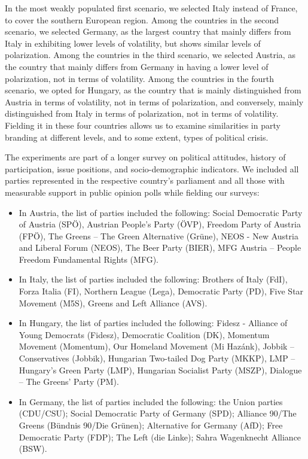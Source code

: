 \documentclass[12pt]{article}
\begin{document}
In the most weakly populated first scenario, we selected Italy instead of France, to cover the southern European region. Among the countries in the second scenario, we selected Germany, as the largest country that mainly differs from Italy in exhibiting lower levels of volatility, but shows similar levels of polarization. Among the countries in the third scenario, we selected Austria, as the country that mainly differs from Germany in having a lower level of polarization, not in terms of volatility. Among the countries in the fourth scenario, we opted for Hungary, as the country that is mainly distinguished from Austria in terms of volatility, not in terms of polarization, and conversely, mainly distinguished from Italy in terms of polarization, not in terms of volatility. Fielding it in these four countries allows us to examine similarities in party branding at different levels, and to some extent, types of political crisis.

The experiments are part of a longer survey on political attitudes, history of participation, issue positions, and socio-demographic indicators. We included all parties represented in the respective country's parliament and all those with measurable support in public opinion polls while fielding our surveys:
\begin{itemize}
\item{In Austria, the list of parties included the following: Social Democratic Party of Austria (SPÖ), Austrian People's Party (ÖVP), Freedom Party of Austria (FPÖ), The Greens – The Green Alternative (Grüne), NEOS - New Austria and Liberal Forum (NEOS), The Beer Party (BIER), MFG Austria – People Freedom Fundamental Rights (MFG).}
\item{In Italy, the list of parties included the following: Brothers of Italy (FdI), Forza Italia (FI), Northern League (Lega), Democratic Party (PD), Five Star Movement (M5S), Greens and Left Alliance (AVS).}
\item{In Hungary, the list of parties included the following: Fidesz - Alliance of Young Democrats (Fidesz), Democratic Coalition (DK), Momentum Movement (Momentum), Our Homeland Movement (Mi Hazánk), Jobbik – Conservatives (Jobbik), Hungarian Two-tailed Dog Party (MKKP), LMP – Hungary's Green Party (LMP), Hungarian Socialist Party (MSZP), Dialogue – The Greens' Party (PM).}
\item{In Germany, the list of parties included the following: the Union parties (CDU/CSU); Social Democratic Party of Germany (SPD); Alliance 90/The Greens (Bündnis 90/Die Grünen); Alternative for Germany (AfD); Free Democratic Party (FDP); The Left (die Linke); Sahra Wagenknecht Alliance (BSW).}
\end{itemize}
\end{document}
